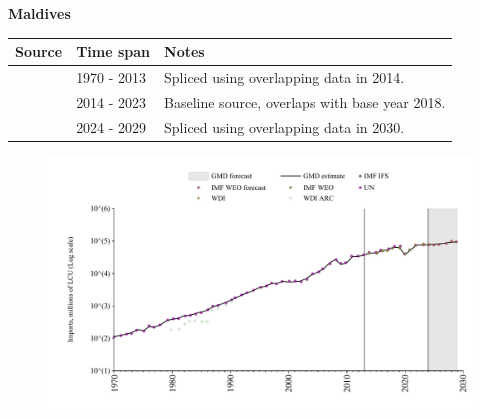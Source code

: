 \documentclass[12pt,a4paper,landscape]{article}
\begin{document}
\begin{adjustbox}{max totalsize={\paperwidth}{\paperheight},center}
\begin{minipage}[t][\textheight][t]{\textwidth}
\vspace*{0.5cm}
{}
\begin{center}
{\Large\bfseries Maldives}
\end{center}
\vspace{0.5cm}
\begin{table}[H]
\centering
\small
\begin{tabular}{|l|l|l|}
\hline
\textbf{Source} & \textbf{Time span} & \textbf{Notes} \\
\hline
\rowcolor{white}\cite{UN}& 1970 - 2013 &Spliced using overlapping data in 2014.\\
\rowcolor{lightgray}\cite{WDI}& 2014 - 2023 &Baseline source, overlaps with base year 2018.\\
\rowcolor{white}\cite{IMF_WEO_forecast}& 2024 - 2029 &Spliced using overlapping data in 2030.\\
\hline
\end{tabular}
\end{table}
\begin{figure}[H]
\centering
\includegraphics[width=\textwidth,height=0.6\textheight,keepaspectratio]{graphs/MDV_imports.pdf}
\end{figure}
\end{minipage}
\end{adjustbox}
\end{document}
